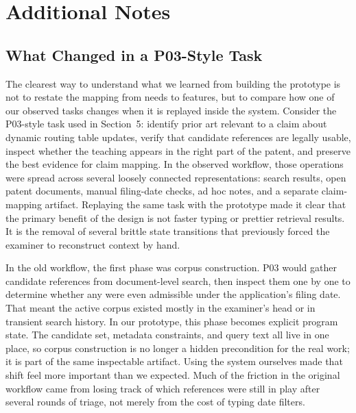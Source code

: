 \documentclass[sigconf]{acmart}
\begin{document}
\section{Additional Notes}

\subsection{What Changed in a P03-Style Task}

The clearest way to understand what we learned from building the prototype is
not to restate the mapping from needs to features, but to compare how one of
our observed tasks changes when it is replayed inside the system. Consider the
P03-style task used in Section~5: identify prior art relevant to a claim about
dynamic routing table updates, verify that candidate references are legally
usable, inspect whether the teaching appears in the right part of the patent,
and preserve the best evidence for claim mapping. In the observed workflow,
those operations were spread across several loosely connected representations:
search results, open patent documents, manual filing-date checks, ad hoc notes,
and a separate claim-mapping artifact. Replaying the same task with the
prototype made it clear that the primary benefit of the design is not faster
typing or prettier retrieval results. It is the removal of several brittle
state transitions that previously forced the examiner to reconstruct context by
hand.

In the old workflow, the first phase was corpus construction. P03 would gather
candidate references from document-level search, then inspect them one by one
to determine whether any were even admissible under the application's filing
date. That meant the active corpus existed mostly in the examiner's head or in
transient search history. In our prototype, this phase becomes explicit program
state. The candidate set, metadata constraints, and query text all live in one
place, so corpus construction is no longer a hidden precondition for the real
work; it is part of the same inspectable artifact. Using the system ourselves
made that shift feel more important than we expected. Much of the friction in
the original workflow came from losing track of which references were still in
play after several rounds of triage, not merely from the cost of typing date
filters.
\end{document}
